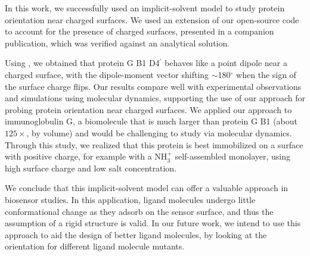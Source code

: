 
In this work, we successfully used an implicit-solvent model to study protein orientation near charged surfaces. We used an extension of our open-source \pygbe code to account for the presence of charged surfaces, presented in a companion publication,\cite{CooperBarba2015a} which was verified against an analytical solution. 

Using \pygbe, we obtained that protein G B1 D4$^\prime$ behaves like a point dipole near a charged surface, with the dipole-moment vector shifting $\sim$180$^\circ$ when the sign of the surface charge flips. Our results compare well with experimental observations and simulations using molecular dynamics, supporting the use of our approach for probing protein orientation near charged surfaces.
We applied our approach to immunoglobulin G, a biomolecule that is much larger than protein G B1 (about $125\times$, by volume) and would be challenging  to study via molecular dynamics. Through this study, we realized that this protein is best immobilized on a surface with positive charge, for example with a NH$^+_3$ self-assembled monolayer, using high surface charge and low salt concentration. 

We conclude that this implicit-solvent model can offer a valuable approach in biosensor studies. In this application, ligand molecules undergo little conformational change as they adsorb on the sensor surface, and thus the assumption of a rigid structure is valid. In our future work, we intend to use this approach to aid the design of better ligand molecules, by looking at the orientation for different ligand molecule mutants. 
